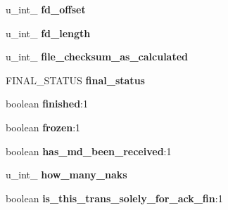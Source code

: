 \begin{DoxyCompactItemize}
\item 
u\+\_\+int\+\_ {\bfseries fd\+\_\+offset}\hypertarget{struct_t_r_a_n_s___s_t_a_t_u_s_a76a8dcbf0559fb2166836b19dcab2471}{}\label{struct_t_r_a_n_s___s_t_a_t_u_s_a76a8dcbf0559fb2166836b19dcab2471}

\item 
u\+\_\+int\+\_ {\bfseries fd\+\_\+length}\hypertarget{struct_t_r_a_n_s___s_t_a_t_u_s_ae544ea51be439f877608252b12d414bd}{}\label{struct_t_r_a_n_s___s_t_a_t_u_s_ae544ea51be439f877608252b12d414bd}

\item 
u\+\_\+int\+\_ {\bfseries file\+\_\+checksum\+\_\+as\+\_\+calculated}\hypertarget{struct_t_r_a_n_s___s_t_a_t_u_s_a27bdc7519ab934ce19f27c7ae2897920}{}\label{struct_t_r_a_n_s___s_t_a_t_u_s_a27bdc7519ab934ce19f27c7ae2897920}

\item 
F\+I\+N\+A\+L\+\_\+\+S\+T\+A\+T\+US {\bfseries final\+\_\+status}\hypertarget{struct_t_r_a_n_s___s_t_a_t_u_s_af6e72c239f9de7827bd48b634578b5f6}{}\label{struct_t_r_a_n_s___s_t_a_t_u_s_af6e72c239f9de7827bd48b634578b5f6}

\item 
boolean {\bfseries finished}\+:1\hypertarget{struct_t_r_a_n_s___s_t_a_t_u_s_aa865d6ea19908b99b10645ad1f7fc94c}{}\label{struct_t_r_a_n_s___s_t_a_t_u_s_aa865d6ea19908b99b10645ad1f7fc94c}

\item 
boolean {\bfseries frozen}\+:1\hypertarget{struct_t_r_a_n_s___s_t_a_t_u_s_a84a627069cfee8ba0268257f0b3e3f03}{}\label{struct_t_r_a_n_s___s_t_a_t_u_s_a84a627069cfee8ba0268257f0b3e3f03}

\item 
boolean {\bfseries has\+\_\+md\+\_\+been\+\_\+received}\+:1\hypertarget{struct_t_r_a_n_s___s_t_a_t_u_s_a5ba0e784f4d11bc73b2fca7ee56dce2e}{}\label{struct_t_r_a_n_s___s_t_a_t_u_s_a5ba0e784f4d11bc73b2fca7ee56dce2e}

\item 
u\+\_\+int\+\_ {\bfseries how\+\_\+many\+\_\+naks}\hypertarget{struct_t_r_a_n_s___s_t_a_t_u_s_a837800c77a515fb383411a618a410dc0}{}\label{struct_t_r_a_n_s___s_t_a_t_u_s_a837800c77a515fb383411a618a410dc0}

\item 
boolean {\bfseries is\+\_\+this\+\_\+trans\+\_\+solely\+\_\+for\+\_\+ack\+\_\+fin}\+:1\hypertarget{struct_t_r_a_n_s___s_t_a_t_u_s_aee238334b9e82f49718ec32291109b11}{}\label{struct_t_r_a_n_s___s_t_a_t_u_s_aee238334b9e82f49718ec32291109b11}


\end{DoxyCompactItemize}
